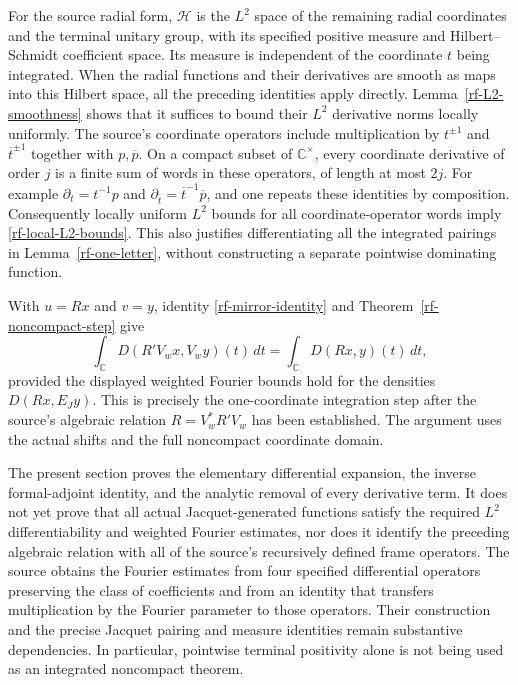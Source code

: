 For the source radial form, $\mathcal H$ is the $L^2$ space
of the remaining radial coordinates and the terminal
unitary group, with its specified positive measure
and Hilbert--Schmidt coefficient space.  Its measure
is independent of the coordinate $t$ being integrated.
When the radial functions and their derivatives are
smooth as maps into this Hilbert space, all the preceding
identities apply directly.  Lemma~\ref{rf-L2-smoothness}
shows that it suffices to bound their $L^2$ derivative
norms locally uniformly.  The source's coordinate
operators include multiplication by $t^{\pm1}$ and
$\overline t^{\pm1}$ together with $p,\overline p$.
On a compact subset of $\mathbb C^\times$, every
coordinate derivative of order $j$ is a finite sum
of words in these operators, of length at most $2j$.
For example $\partial_t=t^{-1}p$ and
$\partial_{\overline t}=\overline t^{-1}\overline p$,
and one repeats these identities by composition.
Consequently locally uniform $L^2$ bounds for all
coordinate-operator words imply
\eqref{rf-local-L2-bounds}.  This also justifies
differentiating all the integrated pairings in
Lemma~\ref{rf-one-letter}, without constructing a
separate pointwise dominating function.

With $u=Rx$ and $v=y$, identity
\eqref{rf-mirror-identity} and Theorem~\ref{rf-noncompact-step}
give
\[
 \int_{\mathbb C}D(R'V_wx,V_wy)(t)\,dt
                  =\int_{\mathbb C}D(Rx,y)(t)\,dt,
\]
provided the displayed weighted Fourier bounds hold for
the densities $D(Rx,E_Jy)$.
This is precisely the one-coordinate integration step
after the source's algebraic relation
$R=V_w^*R'V_w$ has been established.
The argument uses the actual shifts and the full
noncompact coordinate domain.

The present section proves the elementary differential
expansion, the inverse formal-adjoint identity, and the
analytic removal of every derivative term.  It does
not yet prove that all actual Jacquet-generated functions
satisfy the required $L^2$ differentiability and weighted
Fourier estimates, nor does it identify the preceding
algebraic relation with all of the source's recursively
defined frame operators.  The source obtains the
Fourier estimates from four specified differential
operators preserving the class of coefficients and
from an identity that transfers multiplication by the
Fourier parameter to those operators.  Their construction
and the precise Jacquet pairing and measure identities
remain substantive dependencies.  In particular,
pointwise terminal positivity alone is not being used
as an integrated noncompact theorem.


